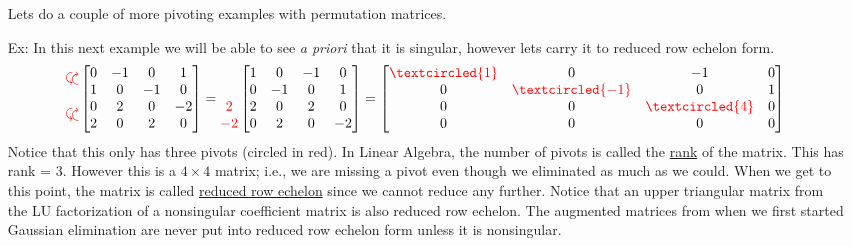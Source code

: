 \documentclass[reqno]{amsart}
\theoremstyle{definition}
\begin{document}
\begin{itemize}
Lets do a couple of more pivoting examples with permutation matrices.

\item[Ex:  ]  In this next example we will be able to see \emph{a priori} that it is singular, however lets carry it to reduced row echelon form.
%
\begin{equation*}
\begin{matrix}
\curvearrowdown\curvearrowup\\
\\
\curvearrowdown\curvearrowup\\

\end{matrix}\begin{bmatrix}
0 & -1 & 0 & 1\\
1 & 0 & -1 & 0\\
0 & 2 & 0 & -2\\
2 & 0 & 2 & 0
\end{bmatrix} = \begin{matrix}
\\
\\
{\color{red}2}\\
{\color{red}-2}
\end{matrix}\begin{bmatrix}
1 & 0 & -1 & 0\\
0 & -1 & 0 & 1\\
2 & 0 & 2 & 0\\
0 & 2 & 0 & -2
\end{bmatrix} = \begin{bmatrix}
{\color{red}\textcircled{1}} & 0 & -1 & 0\\
0 & {\color{red}\textcircled{-1}} & 0 & 1\\
0 & 0 & {\color{red}\textcircled{4}} & 0\\
0 & 0 & 0 & 0
\end{bmatrix}
\end{equation*}
%
Notice that this only has three pivots (circled in red).  In Linear Algebra, the number of pivots is called the {\color{red}\underline{rank}} of the matrix.  This has rank = 3.  However this is a $4\times 4$ matrix; i.e., we are missing a pivot even though we eliminated as much as we could.  When we get to this point, the matrix is called {\color{red}\underline{reduced row echelon}} since we cannot reduce any further.  Notice that an upper triangular matrix from the LU factorization of a nonsingular coefficient matrix is also reduced row echelon.  The augmented matrices from when we first started Gaussian elimination are never put into reduced row echelon form unless it is nonsingular.


\end{itemize}
\end{document}
